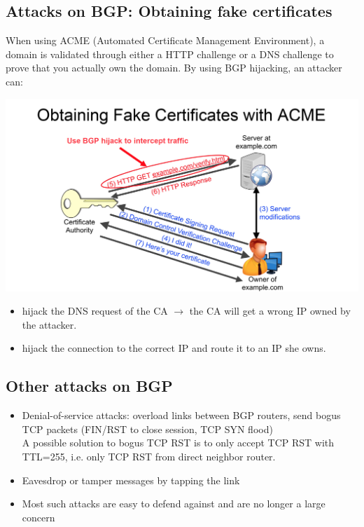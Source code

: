 \subsection{Attacks on BGP: Obtaining fake certificates}

When using ACME (Automated Certificate Management Environment), a domain is validated through either a HTTP challenge or a DNS challenge to prove that you actually own the domain. By using BGP hijacking, an attacker can:

\begin{minipage}{\linewidth}
    \centering      
    \includegraphics[width=\linewidth]{Figures/BGP_fake_certificates.PNG} 
\end{minipage}

\begin{itemize}
	\item hijack the DNS request of the CA $\rightarrow$ the CA will get a wrong IP owned by the attacker.
	\item hijack the connection to the correct IP and route it to an IP she owns.
\end{itemize}

\subsection{Other attacks on BGP}

\begin{itemize}
	\item Denial-of-service attacks: overload links between BGP routers, send bogus TCP packets (FIN/RST to close session, TCP SYN flood)\\
	A possible solution to bogus TCP RST is to only accept TCP RST with TTL=255, i.e. only TCP RST from direct neighbor router.
	\item Eavesdrop or tamper messages by tapping the link
	\item Most such attacks are easy to defend against and are no longer a large concern
\end{itemize}

